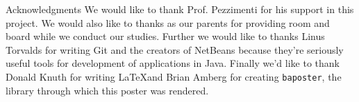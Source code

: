 \documentclass[landscape,fontscale=.8,paperwidth=24in,paperheight=18in]{baposter} %
\begin{document}
\begin{poster}

\begin{posterbox}[name=conclusion, column=44, below=padding, span=14]{Acknowledgments} 
We would like to thank Prof. Pezzimenti for his support in this project. We would also like to thanks as our parents for providing room and board while we conduct our studies. Further we would like to thanks Linus Torvalds for writing Git and the creators of NetBeans because they're seriously useful tools for development of applications in Java. Finally we'd like to thank Donald Knuth for writing \LaTeX and Brian Amberg for creating \verb|baposter|, the library through which this poster was rendered.
\end{posterbox}

\end{poster}
\end{document}
